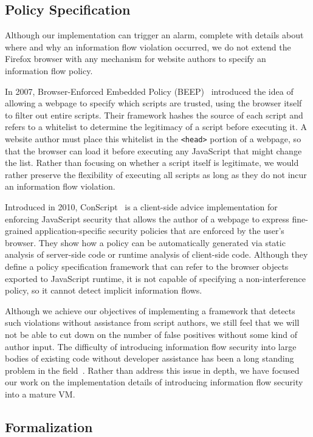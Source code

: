 \documentclass[preprint]{sigplanconf}
\begin{document}
\subsection{Policy Specification}
\label{sec:policy_specification}

Although our implementation can trigger an alarm, complete with details about where and why an information flow violation occurred, we do not extend the Firefox browser with any mechanism for website authors to specify an information flow policy.

In 2007, Browser-Enforced Embedded Policy (BEEP)~\cite{beep} introduced the idea of allowing a webpage to specify which scripts are trusted, using the browser itself to filter out entire scripts.
Their framework hashes the source of each script and refers to a whitelist to determine the legitimacy of a script before executing it.
A website author must place this whitelist in the \texttt{<head>} portion of a webpage, so that the browser can load it before executing any JavaScript that might change the list.
Rather than focusing on whether a script itself is legitimate, we would rather preserve the flexibility of executing all scripts as long as they do not incur an information flow violation.

Introduced in 2010, ConScript~\cite{5504806} is a client-side advice implementation for enforcing JavaScript security that allows the author of a webpage to express fine-grained application-specific security policies that are enforced by the user's browser.
They show how a policy can be automatically generated via static analysis of server-side code or runtime analysis of client-side code.
Although they define a policy specification framework that can refer to the browser objects exported to JavaScript runtime, it is not capable of specifying a non-interference policy, so it cannot detect implicit information flows.

Although we achieve our objectives of implementing a framework that detects such violations without assistance from script authors,  we still feel that we will not be able to cut down on the number of false positives without some kind of author input.
The difficulty of introducing information flow security into large bodies of existing code without developer assistance has been a long standing problem in the field~\cite{1159651}.
Rather than address this issue in depth, we have focused our work on the implementation details of introducing information flow security into a mature VM.

\subsection{Formalization}
\end{document}
